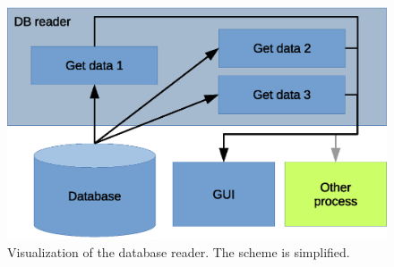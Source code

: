 \documentclass[]{scrreprt}
\begin{document}
	\begin{figure}[H]
		\centering
		\includegraphics[width=12.64cm]{images/dbReader.eps}
		\caption[Database reader]{Visualization of the database reader. The scheme is simplified.}
		\label{fig:DBreader}
	\end{figure}
\end{document}
